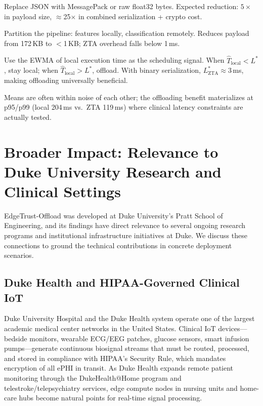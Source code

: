 \documentclass[10pt,twocolumn]{article}
\begin{document}
\begin{description}[leftmargin=1.5em,style=nextline]
\item[\textbf{R1 — Binary serialization.}]
Replace JSON with MessagePack or raw float32 bytes.  Expected reduction:
$5\times$ in payload size, $\approx$25$\times$ in combined serialization +
crypto cost.

\item[\textbf{R2 — Feature-level offloading.}]
Partition the pipeline: features locally, classification remotely.  Reduces
payload from 172\,KB to $<$1\,KB; ZTA overhead falls below 1\,ms.

\item[\textbf{R3 — Complexity-adaptive scheduling.}]
Use the EWMA of local execution time as the scheduling signal.  When
$\hat{T}_{\text{local}} < L^*$, stay local; when
$\hat{T}_{\text{local}} > L^*$, offload.  With binary serialization,
$L^*_{\text{ZTA}} \approx 3$\,ms, making offloading universally beneficial.

\item[\textbf{R4 — Monitor tail latency, not mean.}]
Means are often within noise of each other; the offloading benefit
materializes at p95/p99 (local 204\,ms vs.\ ZTA 119\,ms) where
clinical latency constraints are actually tested.
\end{description}

\section{Broader Impact: Relevance to Duke University Research and Clinical Settings}
\label{sec:duke}

EdgeTrust-Offload was developed at Duke University's Pratt School of
Engineering, and its findings have direct relevance to several ongoing
research programs and institutional infrastructure initiatives at Duke.
We discuss these connections to ground the technical contributions in
concrete deployment scenarios.

\subsection{Duke Health and HIPAA-Governed Clinical IoT}

Duke University Hospital and the Duke Health system operate one of the
largest academic medical center networks in the United States.  Clinical
IoT devices—bedside monitors, wearable ECG/EEG patches, glucose sensors,
smart infusion pumps—generate continuous biosignal streams that must be
routed, processed, and stored in compliance with HIPAA's Security Rule,
which mandates encryption of all ePHI in transit.  As Duke Health expands
remote patient monitoring through the DukeHealth@Home program and
telestroke/telepsychiatry services, edge compute nodes in nursing units
and home-care hubs become natural points for real-time signal processing.
\end{document}
